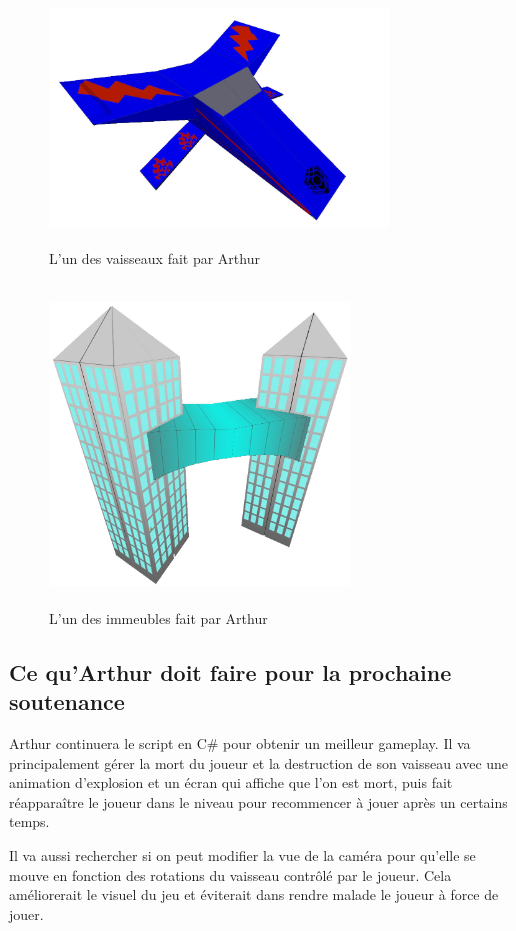 \documentclass[10pt, titlepage]{report}
\begin{document}
\begin{figure}
\center
\includegraphics[height=6cm, width=9cm]{vaisseau_arthur.jpg}
\caption{L'un des vaisseaux fait par Arthur}

\includegraphics[height=8.5cm, width=8cm]{batiment_arthur.jpg}
\caption{L'un des immeubles fait par Arthur}
\end{figure}

\subsection{Ce qu'Arthur doit faire pour la prochaine soutenance}

Arthur continuera le script en C\# pour obtenir un meilleur gameplay. Il va principalement gérer la mort du joueur et la destruction de son vaisseau avec une animation d'explosion  et un écran qui affiche que l'on est mort, puis fait réapparaître le joueur dans le niveau pour recommencer à jouer après un certains temps.

 Il va aussi rechercher si on peut modifier la vue de la caméra pour qu'elle se mouve en fonction des rotations du vaisseau contrôlé par le joueur. Cela améliorerait le visuel du jeu et éviterait dans rendre malade le joueur à force de jouer.\\
\end{document}
